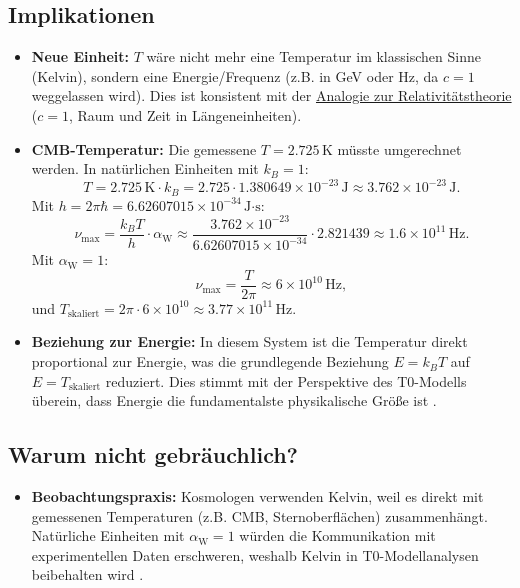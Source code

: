 \documentclass[12pt,a4paper]{article}
\newcommand{\alphaW}{\alpha_{\text{W}}}
\begin{document}
	\subsection{Implikationen}
	\label{subsec:implications}
	\begin{tcolorbox}[colback=blue!5!white,colframe=blue!75!black,title={Implikationen von \(\alphaW = 1\)}]
		\begin{itemize}
			\item \textbf{Neue Einheit:} \(T\) wäre nicht mehr eine Temperatur im klassischen Sinne (Kelvin), sondern eine Energie/Frequenz (z.B. in GeV oder Hz, da \(c = 1\) weggelassen wird). Dies ist konsistent mit der \href{https://github.com/jpascher/T0-Time-Mass-Duality/tree/main/2/pdf/Deutsch/ZeitRaumPascher.pdf}{Analogie zur Relativitätstheorie} (\(c = 1\), Raum und Zeit in Längeneinheiten).
			\item \textbf{CMB-Temperatur:} Die gemessene \(T = 2.725 \, \text{K}\) müsste umgerechnet werden. In natürlichen Einheiten mit \(k_B = 1\):
			\[
			T = 2.725 \, \text{K} \cdot k_B = 2.725 \cdot 1.380649 \times 10^{-23} \, \text{J} \approx 3.762 \times 10^{-23} \, \text{J}.
			\]
			Mit \(h = 2\pi \hbar = 6.62607015 \times 10^{-34} \, \text{J·s}\):
			\[
			\nu_{\text{max}} = \frac{k_B T}{h} \cdot \alphaW \approx \frac{3.762 \times 10^{-23}}{6.62607015 \times 10^{-34}} \cdot 2.821439 \approx 1.6 \times 10^{11} \, \text{Hz}.
			\]
			Mit \(\alphaW = 1\):
			\[
			\nu_{\text{max}} = \frac{T}{2\pi} \approx 6 \times 10^{10} \, \text{Hz},
			\]
			und \(T_{\text{skaliert}} = 2\pi \cdot 6 \times 10^{10} \approx 3.77 \times 10^{11} \, \text{Hz}\).
			\item \textbf{Beziehung zur Energie:} In diesem System ist die Temperatur direkt proportional zur Energie, was die grundlegende Beziehung \(E = k_B T\) auf \(E = T_{\text{skaliert}}\) reduziert. Dies stimmt mit der Perspektive des T0-Modells überein, dass Energie die fundamentalste physikalische Größe ist \cite{pascher_alpha_2025}.
		\end{itemize}
	\end{tcolorbox}
	
	\subsection{Warum nicht gebräuchlich?}
	\label{subsec:why_not_common}
	
	\begin{itemize}
		\item \textbf{Beobachtungspraxis:} Kosmologen verwenden Kelvin, weil es direkt mit gemessenen Temperaturen (z.B. CMB, Sternoberflächen) zusammenhängt. Natürliche Einheiten mit \(\alphaW = 1\) würden die Kommunikation mit experimentellen Daten erschweren, weshalb Kelvin in T0-Modellanalysen beibehalten wird \cite{pascher_messdifferenzen_2025}.
	\end{itemize}
	
\end{document}
